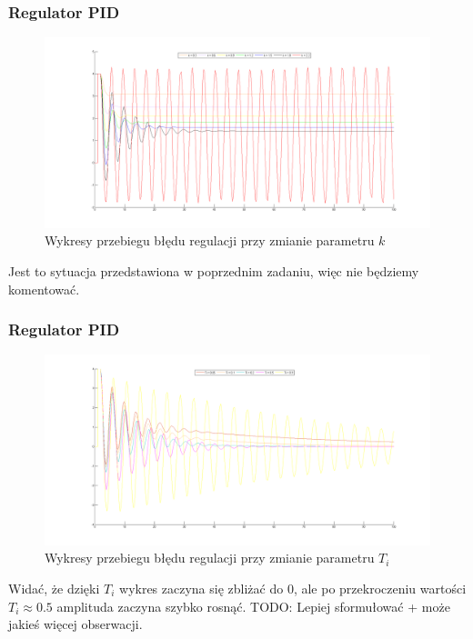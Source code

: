 \documentclass[a4paper,10pt]{article}
\begin{document}
\subsubsection{Regulator PID}
\begin{figure}[!h]
    \centering
	\includegraphics[width=120mm]{CW5-N3C2d1-k03-22.png}
	\caption{Wykresy przebiegu błędu regulacji przy zmianie parametru $k$}
    \label{fig:symulacjaP}
\end{figure}

Jest to sytuacja przedstawiona w poprzednim zadaniu, więc nie będziemy komentować.

\subsubsection{Regulator PID}
\begin{figure}[!h]
    \centering
	\includegraphics[width=120mm]{CW5-N3C2d1-k18-ti005-09.png}
	\caption{Wykresy przebiegu błędu regulacji przy zmianie parametru $T_i$}
    \label{fig:symulacjaP}
\end{figure}

Widać, że dzięki $T_i$ wykres zaczyna się zbliżać do 0, ale po przekroczeniu wartości $T_i \approx 0.5$ amplituda zaczyna szybko rosnąć.
TODO: Lepiej sformułować + może jakieś więcej obserwacji.
\end{document}
